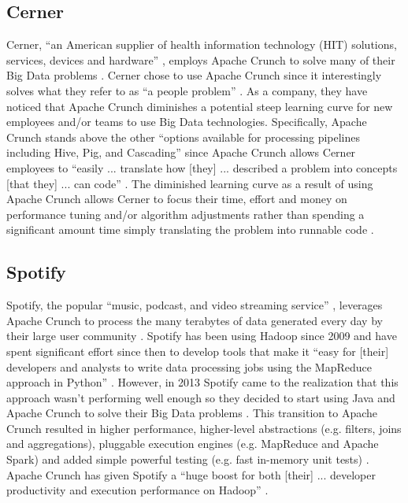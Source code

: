 \documentclass[9pt,twocolumn,twoside]{../../styles/osajnl}
\begin{document}
\subsection{Cerner} \label{cerner}
Cerner, ``an American supplier of health information technology (HIT)
solutions, services, devices and hardware'' \cite{www-cerner}, employs
Apache Crunch to solve many of their Big Data problems
\cite{www-crunch-cerner}. Cerner chose to use Apache Crunch since it
interestingly solves what they refer to as ``a people problem''
\cite{www-crunch-cerner}. As a company, they have noticed that Apache
Crunch diminishes a potential steep learning curve for new employees
and/or teams to use Big Data technologies. Specifically, Apache Crunch
stands above the other ``options available for processing pipelines
including Hive, Pig, and Cascading'' since Apache Crunch allows Cerner
employees to ``easily ... translate how [they] ...
described a problem
into concepts [that they] ... can code'' \cite{www-crunch-cerner}. The
diminished learning curve as a result of using Apache Crunch allows
Cerner to focus their time, effort and money on performance tuning
and/or algorithm adjustments rather than spending a significant amount
time simply translating the problem into runnable code
\cite{www-crunch-cerner}.

\subsection{Spotify} \label{spotify}
Spotify, the popular ``music, podcast, and video streaming service''
\cite{www-spotify}, leverages Apache Crunch to process the many
terabytes of data generated every day by their large user community
\cite{www-crunch-spotify}. Spotify has been using Hadoop since 2009
and have spent significant effort since then to develop tools that
make it ``easy for [their] developers and analysts to write data
processing jobs using the MapReduce approach in Python''
\cite{www-crunch-spotify}. However, in 2013 Spotify came to the
realization that this approach wasn't performing well enough so they
decided to start using Java and Apache Crunch to solve their Big Data
problems \cite{www-crunch-spotify}. This transition to Apache Crunch
resulted in higher performance, higher-level abstractions (e.g.
filters, joins and aggregations), pluggable execution engines
(e.g. MapReduce and Apache Spark) and added simple powerful testing
(e.g. fast in-memory unit tests) \cite{www-crunch-spotify}. Apache
Crunch has given Spotify a ``huge boost for both [their] ... developer
productivity and execution performance on Hadoop''
\cite{www-crunch-spotify}.
\end{document}
